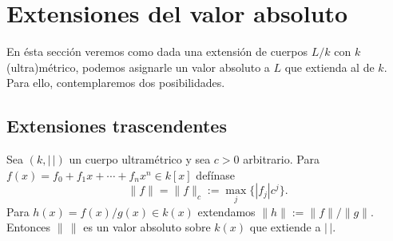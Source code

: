 \documentclass[teoria-numeros.tex]{subfiles}
\begin{document}
\section{Extensiones del valor absoluto}
En ésta sección veremos como dada una extensión de cuerpos $L/k$ con $k$ (ultra)métrico, podemos asignarle un valor absoluto a $L$
que extienda al de $k$.
Para ello, contemplaremos dos posibilidades.

\subsection{Extensiones trascendentes}%
\label{sec:val_trasc_ext}

\begin{thm}\label{thm:abs_val_over_kx}
	Sea $(k, |\,|)$ un cuerpo ultramétrico y sea $c > 0$ arbitrario.
	Para $f(x) = f_0 + f_1x + \cdots + f_nx^n \in k[x]$ defínase
	$$ \|f\| = \|f\|_c := \max_j\{ |f_j| c^j \}. $$
	Para $h(x) = f(x)/g(x) \in k(x)$ extendamos $\|h\| := \|f\| / \|g\|$.
	Entonces $\|\,\|$ es un valor absoluto sobre $k(x)$ que extiende a $|\,|$.
\end{thm}
\end{document}
